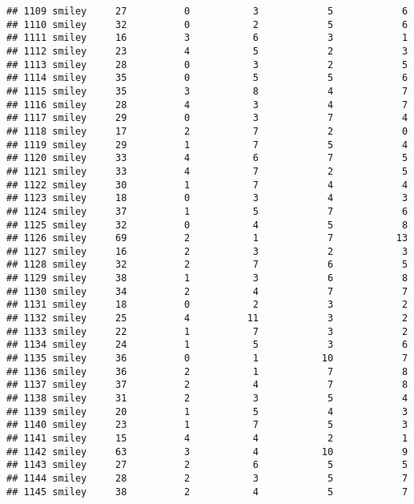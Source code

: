 \documentclass[
]{article}
\begin{document}
\begin{verbatim}
## 1109 smiley     27          0           3            5            6
## 1110 smiley     32          0           2            5            6
## 1111 smiley     16          3           6            3            1
## 1112 smiley     23          4           5            2            3
## 1113 smiley     28          0           3            2            5
## 1114 smiley     35          0           5            5            6
## 1115 smiley     35          3           8            4            7
## 1116 smiley     28          4           3            4            7
## 1117 smiley     29          0           3            7            4
## 1118 smiley     17          2           7            2            0
## 1119 smiley     29          1           7            5            4
## 1120 smiley     33          4           6            7            5
## 1121 smiley     33          4           7            2            5
## 1122 smiley     30          1           7            4            4
## 1123 smiley     18          0           3            4            3
## 1124 smiley     37          1           5            7            6
## 1125 smiley     32          0           4            5            8
## 1126 smiley     69          2           1            7           13
## 1127 smiley     16          2           3            2            3
## 1128 smiley     32          2           7            6            5
## 1129 smiley     38          1           3            6            8
## 1130 smiley     34          2           4            7            7
## 1131 smiley     18          0           2            3            2
## 1132 smiley     25          4          11            3            2
## 1133 smiley     22          1           7            3            2
## 1134 smiley     24          1           5            3            6
## 1135 smiley     36          0           1           10            7
## 1136 smiley     36          2           1            7            8
## 1137 smiley     37          2           4            7            8
## 1138 smiley     31          2           3            5            4
## 1139 smiley     20          1           5            4            3
## 1140 smiley     23          1           7            5            3
## 1141 smiley     15          4           4            2            1
## 1142 smiley     63          3           4           10            9
## 1143 smiley     27          2           6            5            5
## 1144 smiley     28          2           3            5            7
## 1145 smiley     38          2           4            5            7

\end{verbatim}
\end{document}
